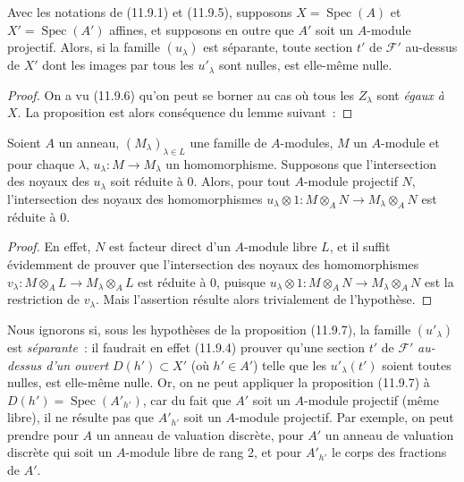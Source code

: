 \begin{proposition}[11.9.7]
\label{IV.11.9.7-fr}
Avec les notations de \textup{(11.9.1)} et \textup{(11.9.5)}, supposons
$X=\operatorname{Spec}(A)$ et $X'=\operatorname{Spec}(A')$ affines, et
supposons en outre que $A'$ soit un $A$-module projectif. Alors, si la famille
$(u_\lambda)$ est séparante, toute section $t'$ de $\mathcal F'$ au-dessus de
$X'$ dont les images par tous les $u'_\lambda$ sont nulles, est elle-même
nulle.
\end{proposition}

\begin{proof}
On a vu (11.9.6) qu'on peut se borner au cas où tous les $Z_\lambda$ sont \emph{égaux
à} $X$. La proposition est alors conséquence du lemme suivant~:
\end{proof}

\begin{lemma}[11.9.7.1]
\label{IV.11.9.7.1-fr}
Soient $A$ un anneau, $(M_\lambda)_{\lambda\in L}$ une famille de $A$-modules,
$M$ un $A$-module et pour chaque $\lambda$,
$u_\lambda:M\to M_\lambda$ un homomorphisme. Supposons que l'intersection des
noyaux des $u_\lambda$ soit réduite à 0. Alors, pour tout $A$-module projectif
$N$, l'intersection des noyaux des homomorphismes
$u_\lambda\otimes 1:M\otimes_A N\to M_\lambda\otimes_A N$ est réduite à 0.
\end{lemma}

\begin{proof}
En effet, $N$ est facteur direct d'un $A$-module libre $L$, et il suffit
évidemment de prouver que l'intersection des noyaux des homomorphismes
$v_\lambda:M\otimes_A L\to M_\lambda\otimes_A L$ est réduite à 0, puisque
$u_\lambda\otimes 1:M\otimes_A N\to M_\lambda\otimes_A N$ est la restriction
de $v_\lambda$. Mais l'assertion résulte alors trivialement de l'hypothèse.
\end{proof}

\begin{remark}[11.9.8]
\label{IV.11.9.8-fr}
Nous ignorons si, sous les hypothèses de la proposition (11.9.7), la famille
$(u'_\lambda)$ est \emph{séparante}~: il faudrait en effet (11.9.4) prouver
qu'une section $t'$ de $\mathcal F'$ \emph{au-dessus d'un ouvert}
$D(h')\subset X'$ (où $h'\in A'$) telle que les $u'_\lambda(t')$ soient toutes
nulles, est elle-même nulle. Or, on ne peut appliquer la proposition (11.9.7)
à $D(h')=\operatorname{Spec}(A'_{h'})$, car du fait que $A'$ soit un
$A$-module projectif (même libre), il ne résulte pas que $A'_{h'}$ soit un
$A$-module projectif. Par exemple, on peut prendre pour $A$ un anneau de
valuation discrète, pour $A'$ un anneau de valuation discrète qui soit un
$A$-module libre de rang 2, et pour $A'_{h'}$ le corps des fractions de $A'$.
\end{remark}

